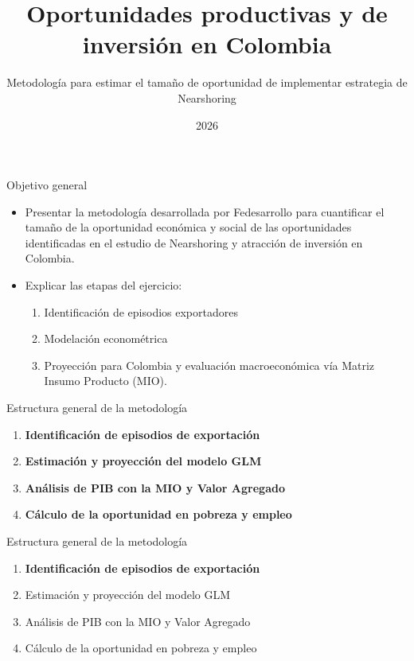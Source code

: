 \documentclass[aspectratio=169,xcolor=dvipsnames]{beamer}
\title{Oportunidades productivas y de inversión en Colombia}
\subtitle{Metodología para estimar el tamaño de oportunidad de implementar estrategia de Nearshoring}
\author{}
\institute{Fedesarrollo}
\date{2026}
\begin{document}
\begin{frame}
    \titlepage
\end{frame}


\begin{frame}{Objetivo general}
    \begin{itemize}
        \item Presentar la metodología desarrollada por Fedesarrollo para cuantificar el tamaño de la oportunidad económica y social de las oportunidades identificadas en el estudio de Nearshoring y atracción de inversión en Colombia.
        \item Explicar las etapas del ejercicio: 
        \begin{enumerate}
            \item Identificación de episodios exportadores
            \item Modelación econométrica
            \item Proyección para Colombia y evaluación macroeconómica vía Matriz Insumo Producto (MIO).
        \end{enumerate}
    \end{itemize}
\end{frame}

\begin{frame}{Estructura general de la metodología}
    \begin{enumerate}
        \item \textbf{Identificación de episodios de exportación}
        \item \textbf{Estimación y proyección del modelo GLM}
        \item \textbf{Análisis de PIB con la MIO y Valor Agregado}
        \item \textbf{Cálculo de la oportunidad en pobreza y empleo}
    \end{enumerate}
\end{frame}

\begin{frame}{Estructura general de la metodología}
    \begin{enumerate}
        \item \textbf{Identificación de episodios de exportación}
        \item \textcolor{gray!70}{Estimación y proyección del modelo GLM}
        \item \textcolor{gray!70}{Análisis de PIB con la MIO y Valor Agregado}
        \item \textcolor{gray!70}{Cálculo de la oportunidad en pobreza y empleo}
    \end{enumerate}
\end{frame}
\end{document}
